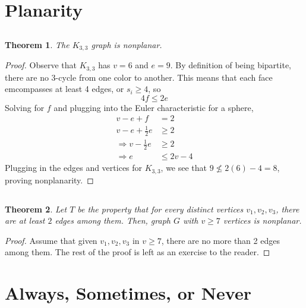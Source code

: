 \documentclass{article}
\newtheorem{theorem}{Theorem}
\begin{document}
\section{Planarity}

\subsection{}

\begin{theorem}
    The \(K_{3, 3}\) graph is nonplanar.
\end{theorem}
\begin{proof}
    Observe that \(K_{3, 3}\) has \(v = 6\) and \(e = 9\).
    By definition of being bipartite, there are no 3-cycle from one color to another.
    This means that each face emcompasses at least 4 edges, or \(s_i \geqslant 4\), so
    \begin{equation}
        4f \leqslant 2e
    \end{equation}
    Solving for \(f\) and plugging into the Euler characteristic for a sphere,
    \begin{align}
        v - e + f &= 2 \\
        v - e + \frac{1}{2}e &\geqslant 2 \\
        \Rightarrow v - \frac{1}{2}e &\geqslant 2 \\
        \Rightarrow e &\leqslant 2v - 4
    \end{align}
    Plugging in the edges and vertices for \(K_{3, 3}\), we see that \(9 \nleqslant 2(6) - 4 = 8\), proving nonplanarity.
\end{proof}

\subsection{}

\begin{theorem}
    Let \(T\) be the property that for every distinct vertices \(v_1, v_2, v_3\), there are at least \(2\) edges among them.
    Then, graph \(G\) with \(v \geqslant 7\) vertices is nonplanar.
\end{theorem}
\begin{proof}
    Assume that given \(v_1, v_2, v_3\) in \(v \geqslant 7\), there are no more than 2 edges among them.
    The rest of the proof is left as an exercise to the reader.
\end{proof}

\section{Always, Sometimes, or Never}
\end{document}
